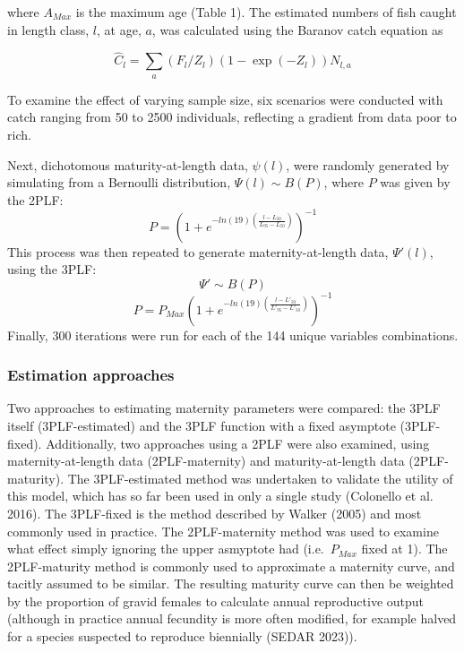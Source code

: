 \documentclass[
]{article}
\begin{document}
where \(A_{Max}\) is the maximum age (Table 1). The estimated numbers of fish caught in length class, \(l\), at age, \(a\), was calculated using the Baranov catch equation as

\[
\hat{C}_{l} = \sum_a(F_{l}/Z_{l})(1-\exp(-Z_{l}))N_{l,a}
\]

To examine the effect of varying sample size, six scenarios were conducted with catch ranging from 50 to 2500 individuals, reflecting a gradient from data poor to rich.

Next, dichotomous maturity-at-length data, \(\psi(l)\), were randomly generated by simulating from a Bernoulli distribution, \(\Psi(l) \sim B(P)\), where \(P\) was given by the 2PLF: \[P =  \left ( 1 + e^{-ln(19)\left ( \frac{l - L_{50}}{L_{95} - L_{50}} \right )}  \right )^{-1}\] This process was then repeated to generate maternity-at-length data, \(\Psi'(l)\), using the 3PLF: \[\Psi' \sim B(P)\] \[P =  P_{Max}\left ( 1 + e^{-ln(19)\left ( \frac{l - L'_{50}}{L'_{95} - L'_{50}} \right )}  \right )^{-1}\] Finally, 300 iterations were run for each of the 144 unique variables combinations.

\subsubsection{Estimation approaches}\label{estimation-approaches}

Two approaches to estimating maternity parameters were compared: the 3PLF itself (3PLF-estimated) and the 3PLF function with a fixed asymptote (3PLF-fixed). Additionally, two approaches using a 2PLF were also examined, using maternity-at-length data (2PLF-maternity) and maturity-at-length data (2PLF-maturity). The 3PLF-estimated method was undertaken to validate the utility of this model, which has so far been used in only a single study (Colonello et al. 2016). The 3PLF-fixed is the method described by Walker (2005) and most commonly used in practice. The 2PLF-maternity method was used to examine what effect simply ignoring the upper asmyptote had (i.e.~\(P_{Max}\) fixed at 1). The 2PLF-maturity method is commonly used to approximate a maternity curve, and tacitly assumed to be similar. The resulting maturity curve can then be weighted by the proportion of gravid females to calculate annual reproductive output (although in practice annual fecundity is more often modified, for example halved for a species suspected to reproduce biennially (SEDAR 2023)).
\end{document}
